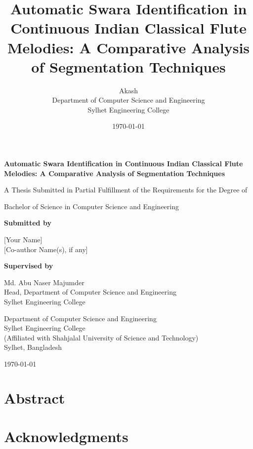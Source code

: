 \documentclass[12pt,a4paper]{report}
\title{\bfseries Automatic Swara Identification in Continuous Indian Classical Flute Melodies: A Comparative Analysis of Segmentation Techniques}
\author{Akash \\ Department of Computer Science and Engineering \\ Sylhet Engineering College}
\date{\today}
\begin{document}
\begin{titlepage}
\centering
\vspace*{2cm}
{\LARGE \bfseries Automatic Swara Identification in Continuous Indian Classical Flute Melodies: A Comparative Analysis of Segmentation Techniques\par}
\vspace{2cm}
{\large A Thesis Submitted in Partial Fulfillment of the Requirements for the Degree of\par}
\vspace{0.5cm}
{\large Bachelor of Science in Computer Science and Engineering\par}
\vspace{2cm}
{\large \textbf{Submitted by}\par}
\vspace{0.3cm}
{\large [Your Name] \\{} [Co-author Name(s), if any]\par}
\vspace{2cm}
{\large \textbf{Supervised by}\par}
\vspace{0.3cm}
{\large Md. Abu Naser Majumder \\ Head, Department of Computer Science and Engineering \\ Sylhet Engineering College\par}
\vspace{2cm}
{\large Department of Computer Science and Engineering\\
Sylhet Engineering College\\
(Affiliated with Shahjalal University of Science and Technology)\\
Sylhet, Bangladesh\par}
\vfill
{\large \today\par}
\end{titlepage}


\chapter*{Abstract}


\chapter*{Acknowledgments}


\tableofcontents
\listoffigures
\listoftables

\clearpage
{}












\end{document}
